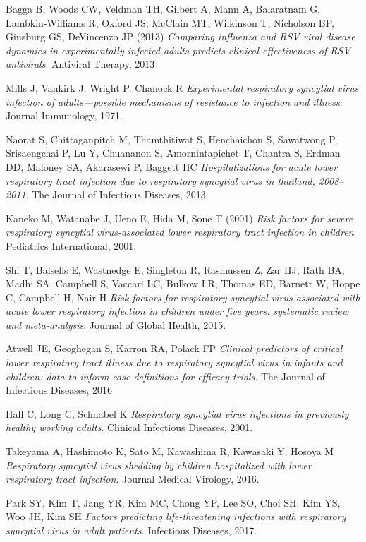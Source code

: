 \documentclass[a4paper]{article}
\begin{document}
\begin{thebibliography}{9}
Bagga B, Woods CW, Veldman TH, Gilbert A, Mann A, Balaratnam G, Lambkin-Williams R, Oxford JS, McClain MT, Wilkinson T, Nicholson BP, Ginsburg GS, DeVincenzo JP (2013) 
\textit{Comparing influenza and RSV viral disease dynamics in experimentally infected adults predicts clinical effectiveness of RSV antivirals}. 
Antiviral Therapy, 2013

Mills J, Vankirk J, Wright P, Chanock R
\textit{Experimental respiratory syncytial virus infection of adults—possible mechanisms of resistance to infection and illness}. 
Journal Immunology, 1971.

Naorat S, Chittaganpitch M, Thamthitiwat S, Henchaichon S, Sawatwong P, Srisaengchai P, Lu Y, Chuananon S, Amornintapichet T, Chantra S, Erdman DD, Maloney SA, Akarasewi P, Baggett HC
\textit{Hospitalizations for acute lower respiratory tract infection due to respiratory syncytial virus in thailand, 2008–2011}.
The Journal of Infectious Diseases, 2013

Kaneko M, Watanabe J, Ueno E, Hida M, Sone T (2001) 
\textit{Risk factors for severe respiratory syncytial virus-associated lower respiratory tract infection in children}.
Pediatrics International, 2001.

Shi T, Balsells E, Wastnedge E, Singleton R, Rasmussen Z, Zar HJ, Rath BA, Madhi SA, Campbell S, Vaccari LC, Bulkow LR, Thomas ED, Barnett W, Hoppe C, Campbell H, Nair H
\textit{Risk factors for respiratory syncytial virus associated with acute lower respiratory infection in children under five years: systematic review and meta-analysis}. 
Journal of Global Health, 2015.

Atwell JE, Geoghegan S, Karron RA, Polack FP
\textit{Clinical predictors of critical lower respiratory
tract illness due to respiratory syncytial virus in infants and children: data to inform case definitions for efficacy trials}. 
The Journal of Infectious Diseases, 2016

Hall C, Long C, Schnabel K 
\textit{Respiratory syncytial virus infections in previously healthy working
adults}.
Clinical Infectious Diseases, 2001.

Takeyama A, Hashimoto K, Sato M, Kawashima R, Kawasaki Y, Hosoya M
\textit{Respiratory syncytial virus shedding by children hospitalized with lower respiratory tract infection}. 
Journal Medical Virology, 2016.

Park SY, Kim T, Jang YR, Kim MC, Chong YP, Lee SO, Choi SH, Kim YS, Woo JH, Kim SH
\textit{Factors predicting life-threatening infections with respiratory syncytial virus in adult patients}.
Infectious Diseases, 2017.


\end{thebibliography}
\end{document}
